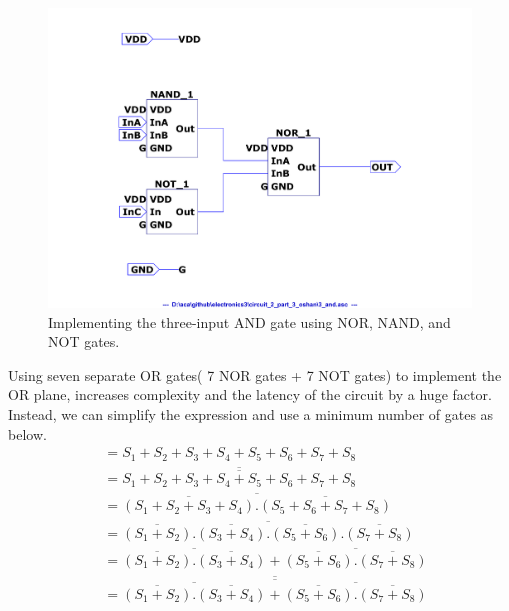 \documentclass[a4paper,11pt]{article}%
\begin{document}
\begin{figure}[H]
	\centering
	\includegraphics[scale=0.7]{figures/Figure332.pdf}
	\caption{Implementing the three-input AND gate using NOR, NAND, and NOT gates.}
\end{figure}

Using seven separate OR gates( 7 NOR gates + 7 NOT gates) to implement the OR plane, increases complexity and the latency of the circuit by a huge factor. Instead, we can simplify the expression and use a minimum number of gates as below.\\

\[
\begin{split}
 & = S_1 + S_2 + S_3 + S_4 + S_5 + S_6 + S_7 + S_8\\
 & = \overline{\overline{S_1 + S_2 + S_3 + S_4 + S_5 + S_6 + S_7 + S_8}}\\
 & = \overline{\overline{\left( S_1 + S_2 + S_3 + S_4 \right)}. \overline{\left( S_5 + S_6 + S_7 + S_8 \right)}}\\
  & = \overline{\overline{\left( S_1 + S_2\right)} .\overline{\left( S_3 + S_4 \right)}. \overline{\left( S_5 + S_6\right)}.  \overline{\left( S_7 + S_8 \right)}}\\
    & = \overline{\overline{\left( S_1 + S_2\right)} .\overline{\left( S_3 + S_4 \right)}}+ \overline{\overline{\left( S_5 + S_6\right)}.  \overline{\left( S_7 + S_8 \right)}}\\
    & = \overline{\overline{ \overline{\overline{\left( S_1 + S_2\right)} .\overline{\left( S_3 + S_4 \right)}}+ \overline{\overline{\left( S_5 + S_6\right)}.  \overline{\left( S_7 + S_8 \right)}} }}
\end{split}
\]
\end{document}
